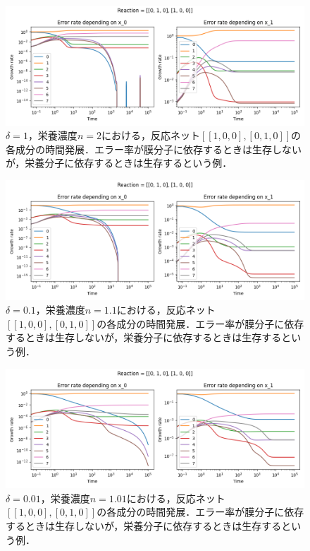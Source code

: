 \documentclass[a4paper,11pt]{jsarticle}
\begin{document}
\begin{figure}[htbp]
  \centering
  \includegraphics[width=\columnwidth]{waste_errslp1_tc_reac1_n2.png}
  \caption{$\delta=1$，栄養濃度$n=2$における，反応ネット$[[1,0,0],[0,1,0]]$の各成分の時間発展．エラー率が膜分子に依存するときは生存しないが，栄養分子に依存するときは生存するという例．}
  \label{fig:errslp1_tc_reac1_n2}
\end{figure}

\begin{figure}[htbp]
  \centering
  \includegraphics[width=\columnwidth]{waste_errslp01_tc_reac1_n11.png}
  \caption{$\delta=0.1$，栄養濃度$n=1.1$における，反応ネット$[[1,0,0],[0,1,0]]$の各成分の時間発展．エラー率が膜分子に依存するときは生存しないが，栄養分子に依存するときは生存するという例．}
  \label{fig:errslp01_tc_reac1_n11}
\end{figure}

\begin{figure}[htbp]
  \centering
  \includegraphics[width=\columnwidth]{waste_errslp001_tc_reac1_n101.png}
  \caption{$\delta=0.01$，栄養濃度$n=1.01$における，反応ネット$[[1,0,0],[0,1,0]]$の各成分の時間発展．エラー率が膜分子に依存するときは生存しないが，栄養分子に依存するときは生存するという例．}
  \label{fig:errslp001_tc_reac1_n101}
\end{figure}
\end{document}
